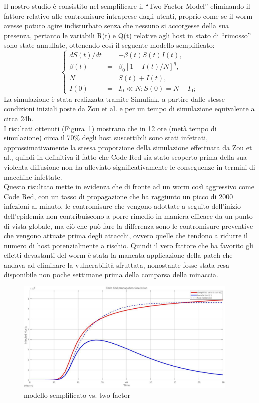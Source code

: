 Il nostro studio è consistito nel semplificare il “Two Factor Model” eliminando il fattore relativo alle contromisure intraprese dagli utenti, proprio come se il worm avesse potuto agire indisturbato senza che nessuno si accorgesse della sua presenza, pertanto le variabili  R(t) e Q(t) relative agli host in stato di “rimosso” sono state annullate, ottenendo così il seguente modello semplificato:
\begin{equation}
\left\{  \begin{array}{rcl} 
                dS(t)/dt &=& -\beta(t)S(t)I(t), \\ 
                \beta(t) &=& \beta_{0}[1 - I(t)/N]^{\eta}, \\ 
                N &=& S(t) + I(t), \\
                I(0) &=& I_{0} \ll N; S(0) = N -I_{0}; 
           \end{array}  \right.
\end{equation}
La simulazione è stata realizzata tramite Simulink, a partire dalle stesse condizioni iniziali poste da Zou et al. e per un tempo di simulazione equivalente a circa 24h.\\
I risultati ottenuti (Figura~\ref{simpler}) mostrano che in 12 ore (metà tempo di simulazione) circa il 70\% degli host suscettibili sono stati infettati, approssimativamente la stessa proporzione della simulazione effettuata da Zou et al., quindi in definitiva il fatto che Code Red sia stato scoperto prima della sua violenta diffusione non ha alleviato significativamente le conseguenze in termini di macchine infettate.\\
Questo risultato mette in evidenza che di fronte ad un worm così aggressivo come Code Red, con un tasso di propagazione che ha raggiunto un picco di 2000 infezioni al minuto, le contromisure che vengono adottate a seguito dell’inizio dell’epidemia non contribuiscono a porre rimedio in maniera efficace da un punto di vista globale, ma ciò che può fare la differenza sono le contromisure preventive che vengono attuate prima degli attacchi, ovvero quelle che tendono a ridurre il numero di host potenzialmente a rischio. Quindi il vero fattore che ha favorito gli effetti devastanti del worm è stata la mancata applicazione della patch che andava ad eliminare la vulnerabilità sfruttata, nonostante fosse stata resa disponibile non poche settimane prima della comparsa della minaccia.\\
\begin{figure}[!hbp]
\centering
\includegraphics[width=0.95\textwidth]{images/simpler.eps}
\caption{modello semplificato vs. two-factor}
\label{simpler}
\end{figure}
